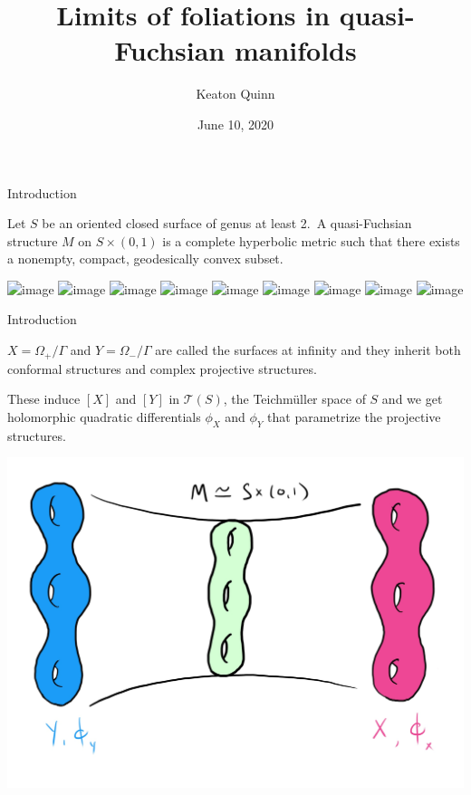 \documentclass[professionalfont]{beamer}
\title{Limits of foliations in quasi-Fuchsian manifolds}
\author{Keaton Quinn}
\institute{University of Illinois at Chicago}
\date{June 10, 2020}
\begin{document}
\makeatletter
{}
{
}
\makeatother



\begin{frame}
\titlepage
\end{frame}




\begin{frame}{Introduction}

Let $S$ be an oriented closed surface of genus at least 2.\pause  \ A quasi-Fuchsian structure $M$ on $S \times (0,1)$ is a complete hyperbolic metric such that there exists a nonempty, compact, geodesically convex subset.

\begin{center}
\includegraphics<1-2|handout:0>[scale=0.09]{Blank}%
\includegraphics<3|handout:0>[scale=0.09]{QF-1.jpg}%
\includegraphics<4|handout:0>[scale=0.09]{QF-2.jpg}%
\includegraphics<5|handout:0>[scale=0.09]{QF-3.jpg}%
\includegraphics<6|handout:0>[scale=0.09]{QF-4.jpg}%
\includegraphics<7|handout:0>[scale=0.09]{QF-5.jpg}%
\includegraphics<8|handout:0>[scale=0.09]{QF-6.jpg}%
\includegraphics<9|handout:0>[scale=0.09]{QF-7.jpg}%
\includegraphics<10>[scale=0.09]{QF-8.jpg}%
\end{center}
	
\end{frame}




\begin{frame}{Introduction}
	
$X = \Omega_+/\Gamma$ and $Y = \Omega_-/\Gamma$ are called the surfaces at infinity and they inherit both conformal structures and complex projective structures. 
\newline

These induce $[X]$ and $[Y]$ in $\mathcal{T}(S)$, the Teichm\"uller space of $S$ and we get holomorphic quadratic differentials $\phi_X$ and $\phi_Y$ that parametrize the projective structures.

\centering\includegraphics[scale=0.1]{QF-sideways.jpg}


\end{frame}
\end{document}
